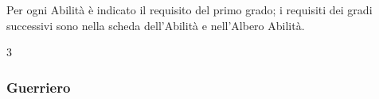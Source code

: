 Per ogni Abilità è indicato il requisito del primo grado; i requisiti dei gradi successivi sono nella scheda dell'Abilità e nell'Albero Abilità.

\begin{multicols}{3}

{\small

\begin{flushleft}

\titlespacing*{\subsubsection}{0pt}{0.5em}{0.5em}\subsubsection*{Guerriero}



\end{flushleft}}
\end{multicols}
